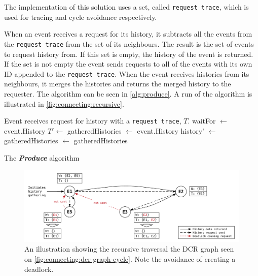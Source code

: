 	\newpar The implementation of this solution uses a set, called \texttt{request trace}, which is used for tracing and cycle avoidance respectively.
	
	When an event receives a request for its history, it subtracts all the events from the \texttt{request trace} from the set of its neighbours. The result is the set of events to request history from. If this set is empty, the history of the event is returned. If the set is not empty the event sends requests to all of the events with its own ID appended to the \texttt{request trace}. When the event receives histories from its neighbours, it merges the histories and returns the merged history to the requester. The algorithm can be seen in \autoref{alg:produce}. A run of the algorithm is illustrated in \autoref{fig:connecting:recursive}.
	
	\begin{algorithm}
		\begin{algorithmic}
			\State Event receives request for history with a \texttt{request trace}, $T$.
			\State
				\State waitFor $\gets$ 
					\Return event.History
				\Else
					\State $T'\gets$
					\State
					\State gatheredHistories $\leftarrow$ event.History
						\State history' $\leftarrow$ 
						\State gatheredHistories $\leftarrow$ 
					\EndFor
					\State\Return gatheredHistories
				\EndIf
			\EndFunction
		\end{algorithmic}
		\caption{The \textit{\textbf{Produce}} algorithm}
		\label{alg:produce}
	\end{algorithm}
	
	\begin{figure}[H]
		\centering
		\includegraphics[width=\textwidth]{4connect/images/recursive.pdf}
		\caption{An illustration showing the recursive traversal the DCR graph seen on \autoref{fig:connecting:dcr-graph-cycle}. Note the avoidance of creating a deadlock.}
		\label{fig:connecting:recursive}
	\end{figure}
	
